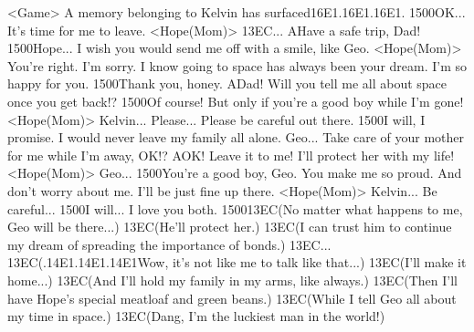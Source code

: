 <Game> A memory belonging to Kelvin has surfaced{16}{E1}.{16}{E1}.{16}{E1}. 
{15}{00}OK... It's time for me to leave. 
<Hope(Mom)> {13}{EC}... 
AHave a safe trip, Dad! 
{15}{00}Hope... I wish you would send me 
off with a smile, like Geo. 
<Hope(Mom)> You're right. I'm sorry. 
I know going to space has always been your dream. 
I'm so happy for you. 
{15}{00}Thank you, honey. 
ADad! 
Will you tell me all about space once you get back!? 
{15}{00}Of course! But only if you're a good boy while I'm gone! 
<Hope(Mom)> Kelvin... 
Please... Please be careful out there. 
{15}{00}I will, I promise. 
I would never leave my family all alone. 
Geo... Take care of your mother for me while I'm away, OK!? 
AOK! Leave it to me! 
I'll protect her with my life! 
<Hope(Mom)> Geo... 
{15}{00}You're a good boy, Geo. You make me so proud. 
And don't worry about me. I'll be just fine up there. 
<Hope(Mom)> Kelvin... Be careful... 
{15}{00}I will... I love you both. 
{15}{00}{13}{EC}(No matter what happens  to me, Geo will be there...) 
{13}{EC}(He'll protect her.) 
{13}{EC}(I can trust him to continue  my dream of spreading  the importance of bonds.) 
{13}{EC}... 
{13}{EC}(.{14}{E1}.{14}{E1}.{14}{E1}Wow, it's not like  me to talk like that...) 
{13}{EC}(I'll make it home...) 
{13}{EC}(And I'll hold my family  in my arms, like always.) 
{13}{EC}(Then I'll have Hope's special  meatloaf and green beans.) 
{13}{EC}(While I tell Geo all  about my time in space.) 
{13}{EC}(Dang, I'm the luckiest  man in the world!) 
